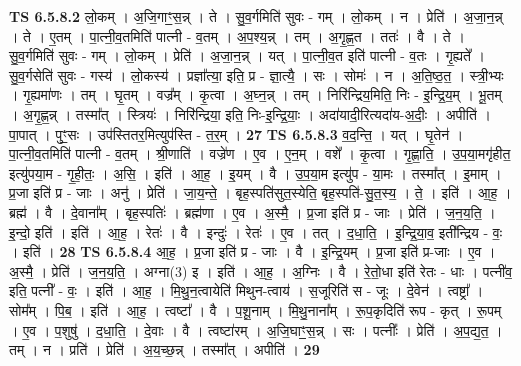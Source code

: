 \documentclass[17pt]{extarticle}
\begin{document}
                  \newline
                                \textbf{ TS 6.5.8.2} \newline
                  लो॒कम् । अ॒जि॒गाꣳ॒॒स॒न्न् । ते । सु॒व॒र्गमिति॑ सुवः - गम् । लो॒कम् । न । प्रेति॑ । अ॒जा॒न॒न्न् । ते । ए॒तम् । पा॒त्नी॒व॒तमिति॑ पात्नी - व॒तम् । अ॒प॒श्य॒न्न् । तम् । अ॒गृ॒ह्ण॒त । ततः॑ । वै । ते । सु॒व॒र्गमिति॑ सुवः - गम् । लो॒कम् । प्रेति॑ । अ॒जा॒न॒न्न् । यत् । पा॒त्नी॒व॒त इति॑ पात्नी - व॒तः । गृ॒ह्यते᳚ । सु॒व॒र्गसेति॑ सुवः - गस्य॑ । लो॒कस्य॑ । प्रज्ञा᳚त्या॒ इति॒ प्र - ज्ञा॒त्यै॒ । सः । सोमः॑ । न । अ॒ति॒ष्ठ॒त॒ । स्त्री॒भ्यः । गृ॒ह्यमा॑णः । तम् । घृ॒तम् । वज्र᳚म् । कृ॒त्वा । अ॒घ्न॒न्न् । तम् । निरि॑न्द्रिय॒मिति॒ निः - इ॒न्द्रि॒य॒म् । भू॒तम् । अ॒गृ॒ह्ण॒न्न् । तस्मा᳚त् । स्त्रियः॑ । निरि॑न्द्रिया॒ इति॒ निः-इ॒न्द्रि॒याः॒ । अदा॑यादी॒रित्यदा॑य-अ॒दीः॒ । अपीति॑ । पा॒पात् । पुꣳ॒॒सः । उप॑स्तितर॒मित्युप॑स्ति - त॒र॒म् । \textbf{  27} \newline
                  \newline
                                \textbf{ TS 6.5.8.3} \newline
                  व॒द॒न्ति॒ । यत् । घृ॒तेन॑ । पा॒त्नी॒व॒तमिति॑ पात्नी - व॒तम् । श्री॒णाति॑ । वज्रे॑ण । ए॒व । ए॒न॒म् । वशे᳚ । कृ॒त्वा । गृ॒ह्णा॒ति॒ । उ॒प॒या॒मगृ॑हीत॒ इत्यु॑पया॒म - गृ॒ही॒तः॒ । अ॒सि॒ । इति॑ । आ॒ह॒ । इ॒यम् । वै । उ॒प॒या॒म इत्यु॑प - या॒मः । तस्मा᳚त् । इ॒माम् । प्र॒जा इति॑ प्र - जाः । अनु॑ । प्रेति॑ । जा॒य॒न्ते॒ । बृह॒स्पति॑सुत॒स्येति॒ बृह॒स्पति॑-सु॒त॒स्य॒ । ते॒ । इति॑ । आ॒ह॒ । ब्रह्म॑ । वै । दे॒वाना᳚म् । बृह॒स्पतिः॑ । ब्रह्म॑णा । ए॒व । अ॒स्मै॒ । प्र॒जा इति॑ प्र - जाः । प्रेति॑ । ज॒न॒य॒ति॒ । इ॒न्दो॒ इति॑ । इति॑ । आ॒ह॒ । रेतः॑ । वै । इन्दुः॑ । रेतः॑ । ए॒व । तत् । द॒धा॒ति॒ । इ॒न्द्रि॒या॒व॒ इती᳚न्द्रिय - वः॒ । इति॑ । \textbf{  28} \newline
                  \newline
                                \textbf{ TS 6.5.8.4} \newline
                  आ॒ह॒ । प्र॒जा इति॑ प्र - जाः । वै । इ॒न्द्रि॒यम् । प्र॒जा इति॑ प्र-जाः । ए॒व । अ॒स्मै॒ । प्रेति॑ । ज॒न॒य॒ति॒ । अग्ना(3) इ । इति॑ । आ॒ह॒ । अ॒ग्निः । वै । रे॒तो॒धा इति॑ रेतः - धाः । पत्नी॑व॒ इति॒ पत्नी᳚ - वः॒ । इति॑ । आ॒ह॒ । मि॒थु॒न॒त्वायेति॑ मिथुन-त्वाय॑ । स॒जूरिति॑ स - जूः । दे॒वेन॑ । त्वष्ट्रा᳚ । सोम᳚म् । पि॒ब॒ । इति॑ । आ॒ह॒ । त्वष्टा᳚ । वै । प॒शू॒नाम् । मि॒थु॒नाना᳚म् । रू॒प॒कृदिति॑ रूप - कृत् । रू॒पम् । ए॒व । प॒शुषु॑ । द॒धा॒ति॒ । दे॒वाः । वै । त्वष्टा॑रम् । अ॒जि॒घाꣳ॒॒स॒न्न् । सः । पत्नीः᳚ । प्रेति॑ । अ॒प॒द्य॒त॒ । तम् । न । प्रति॑ । प्रेति॑ । अ॒य॒च्छ॒न्न् । तस्मा᳚त् । अपीति॑ । \textbf{  29} \newline
\end{document}
